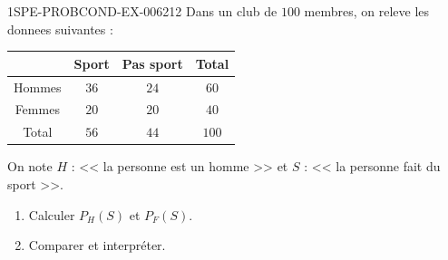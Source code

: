\begin{exercice}{1SPE-PROBCOND-EX-006}{2}{12}
Dans un club de $100$ membres, on releve les donnees suivantes :

\begin{center}
\begin{tabular}{|c|c|c|c|}
\hline
 & Sport & Pas sport & Total \\
\hline
Hommes & $36$ & $24$ & $60$ \\
\hline
Femmes & $20$ & $20$ & $40$ \\
\hline
Total & $56$ & $44$ & $100$ \\
\hline
\end{tabular}
\end{center}

On note $H$ : << la personne est un homme >> et $S$ : << la personne fait du sport >>.

\begin{enumerate}
  \item Calculer $P_H(S)$ et $P_F(S)$.
  \item Comparer et interpréter.
\end{enumerate}
\end{exercice}
